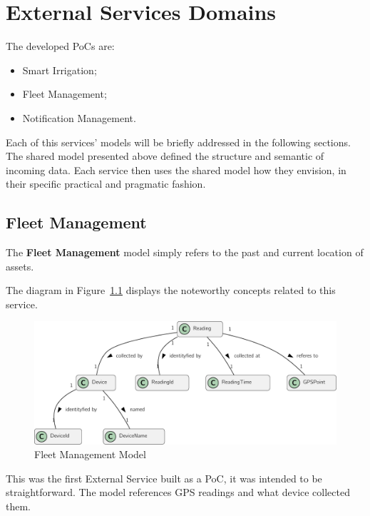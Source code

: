 
\chapter{External Services Domains}
\label{appendix:design:domain:services_contexts}

The developed \gls{PoC}s are:

\begin{itemize}
      \item Smart Irrigation;
      \item Fleet Management;
      \item Notification Management.
\end{itemize}

Each of this services' models will be briefly addressed in the following sections. The shared model presented above defined the structure and semantic of incoming data. Each service then uses the shared model how they envision, in their specific practical and pragmatic fashion.

\section{Fleet Management}
\label{subsubsec:design:domain:bounded_contexts:fleet}

The \textbf{Fleet Management} model simply refers to the past and current location of assets.

The diagram in Figure~\ref{fig:design:domain:bounded_contexts:fleet:diagram} displays the noteworthy concepts related to this service.

\begin{figure}[H]
   \centering
   \includegraphics[page=1,width=\columnwidth]{assets/diagrams/design/domain/fleet-management-model.pdf}
  \caption[Fleet Management Model]{Fleet Management Model}
  \label{fig:design:domain:bounded_contexts:fleet:diagram}
\end{figure}

This was the first External Service built as a \gls{PoC}, it was intended to be straightforward. The model references \gls{GPS} readings and what device collected them.

